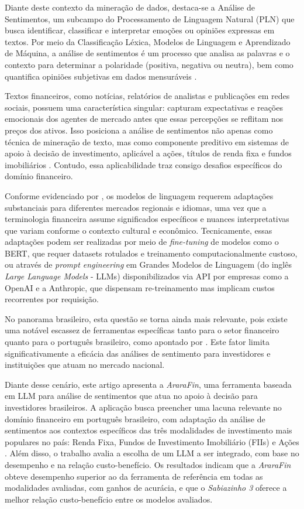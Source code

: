 \documentclass[12pt]{article}
\begin{document}
Diante deste contexto da mineração de dados, destaca-se a Análise de Sentimentos, um subcampo do Processamento de Linguagem Natural (PLN) que busca identificar, classificar e interpretar emoções ou opiniões expressas em textos. Por meio da Classificação Léxica, Modelos de Linguagem e Aprendizado de Máquina, a análise de sentimentos é um processo que analisa as palavras e o contexto para determinar a polaridade (positiva, negativa ou neutra), bem como quantifica opiniões subjetivas em dados mensuráveis \cite{caseli2024processamento}. 

Textos financeiros, como notícias, relatórios de analistas e publicações em redes sociais, possuem uma característica singular: capturam expectativas e reações emocionais dos agentes de mercado antes que essas percepções se reflitam nos preços dos ativos. Isso posiciona a análise de sentimentos não apenas como técnica de mineração de texto, mas como componente preditivo em sistemas de apoio à decisão de investimento, aplicável a ações, títulos de renda fixa e fundos imobiliários \cite{darwish2025stockforecasting}. Contudo, essa aplicabilidade traz consigo desafios específicos do domínio financeiro.

Conforme evidenciado por \cite{mahendran2025comparative}, os modelos de linguagem requerem adaptações substanciais para diferentes mercados regionais e idiomas, uma vez que a terminologia financeira assume significados específicos e nuances interpretativas que variam conforme o contexto cultural e econômico. Tecnicamente, essas adaptações podem ser realizadas por meio de \textit{fine-tuning} de modelos como o BERT, que requer datasets rotulados e treinamento computacionalmente custoso, ou através de \textit{prompt engineering} em Grandes Modelos de Linguagem (do inglês \textit{Large Language Models} - LLMs) disponibilizados via API por empresas como a OpenAI e a Anthropic, que dispensam re-treinamento mas implicam custos recorrentes por requisição.

No panorama brasileiro, esta questão se torna ainda mais relevante, pois existe uma notável escassez de ferramentas específicas tanto para o setor financeiro quanto para o português brasileiro, como apontado por \cite{santos2023finbert}. Este fator limita significativamente a eficácia das análises de sentimento para investidores e instituições que atuam no mercado nacional.

Diante desse cenário, este artigo apresenta a \textit{AraraFin}, uma ferramenta baseada em LLM para análise de sentimentos que atua no apoio à decisão para investidores brasileiros. A aplicação busca preencher uma lacuna relevante no domínio financeiro em português brasileiro, com adaptação da análise de sentimentos aos contextos específicos das três modalidades de investimento mais populares no país: Renda Fixa, Fundos de Investimento Imobiliário (FIIs) e Ações \cite{anbima2024}. Além disso, o trabalho avalia a escolha de um LLM a ser integrado, com base no desempenho e na relação custo-benefício. Os resultados indicam que a \textit{AraraFin} obteve desempenho superior ao da ferramenta de referência em todas as modalidades avaliadas, com ganhos de acurácia, e que o \textit{Sabiazinho 3} oferece a melhor relação custo-benefício entre os modelos avaliados.
\end{document}
